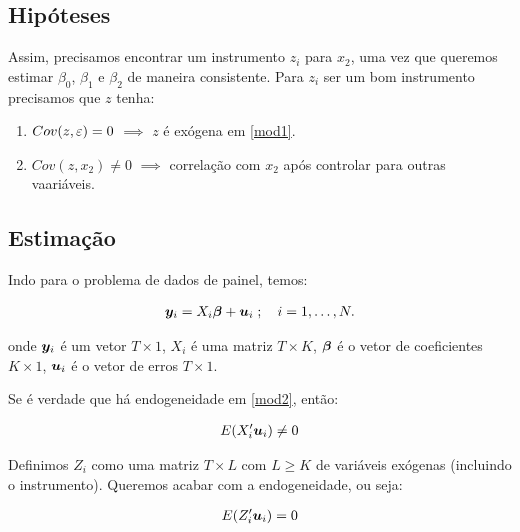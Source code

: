 \documentclass[11pt,oneside,a4paper]{article}
\numberwithin{equation}{section}
\begin{document}
\subsection*{Hipóteses}

Assim, precisamos encontrar um instrumento $z_{i}$ para $x_{2}$, uma vez que queremos estimar $\beta_{0}$, $\beta_{1}$ e $\beta_{2}$ de maneira consistente.
Para $z_{i}$ ser um bom instrumento precisamos que $z$ tenha:

\begin{enumerate}\itemsep0pt
\item $Cov(z, \varepsilon) = 0$ $\implies$  $z$ é exógena em \eqref{mod1}.
\item $Cov(z, x_{2}) \neq 0$ $\implies$  correlação com $x_{2}$ após controlar para outras vaariáveis.
\end{enumerate}

\subsection*{Estimação}

Indo para o problema de dados de painel, temos:

\vspace{-1 em}
\begin{align} \label{mod2}
	\boldsymbol{y}_{i} = X_{i} \boldsymbol{\beta} + \boldsymbol{u}_{i}
	\; ; \quad i = 1, \dots, N.
\end{align}

\noindent
onde 
$\boldsymbol{y}_{i}$ é um vetor $T \times 1$,
$X_{i}$ é uma matriz $T \times K$,
$\boldsymbol{\beta}$ é o vetor de coeficientes $K \times 1$,
$\boldsymbol{u}_{i}$ é o vetor de erros $T \times 1$.

Se é verdade que há endogeneidade em \eqref{mod2}, então:

\vspace{-1 em}
\begin{align*}
	E(X_{i}^{\prime} \boldsymbol{u}_{i}) \neq 0
\end{align*}

Definimos $Z_{i}$ como uma matriz $T \times L$ com $L \geq K$ de variáveis exógenas (incluindo o instrumento).
Queremos acabar com a endogeneidade, ou seja:

\vspace{-1 em}
\begin{align*}
	E(Z_{i}^{\prime} \boldsymbol{u}_{i}) = 0
\end{align*}
\end{document}
